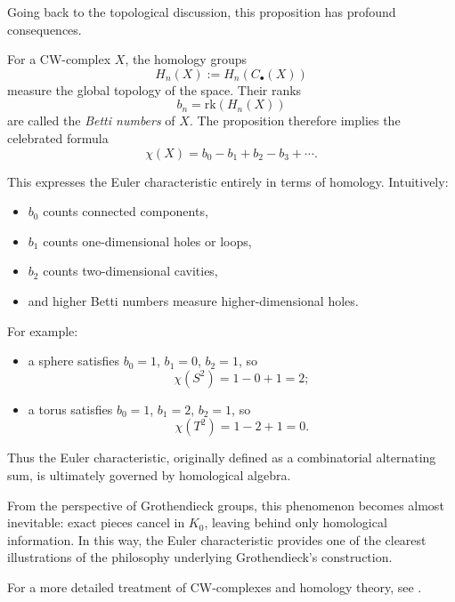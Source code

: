 \documentclass[12pt,reqno]{amsart}
\theoremstyle{plain}
\numberwithin{equation}{section}
\begin{document}
\medskip
Going back to the topological discussion, this proposition has profound consequences.

For a CW-complex $X$, the homology groups
\[
H_n(X):=H_n(C_\bullet(X))
\]
measure the global topology of the space. Their ranks
\[
b_n=\mathrm{rk}(H_n(X))
\]
are called the \emph{Betti numbers} of $X$.
The proposition therefore implies the celebrated formula
\[
\chi(X)
=
b_0-b_1+b_2-b_3+\cdots.
\]

This expresses the Euler characteristic entirely in terms of homology.
Intuitively:
\begin{itemize}
    \item $b_0$ counts connected components,
    \item $b_1$ counts one-dimensional holes or loops,
    \item $b_2$ counts two-dimensional cavities,
    \item and higher Betti numbers measure higher-dimensional holes.
\end{itemize}

For example:
\begin{itemize}
    \item a sphere satisfies $b_0=1$, $b_1=0$, $b_2=1$, so
    \[
    \chi(S^2)=1-0+1=2;
    \]
    \item a torus satisfies $b_0=1$, $b_1=2$, $b_2=1$, so
    \[
    \chi(T^2)=1-2+1=0.
    \]
\end{itemize}

Thus the Euler characteristic, originally defined as a combinatorial alternating sum, is ultimately governed by homological algebra.

From the perspective of Grothendieck groups, this phenomenon becomes almost inevitable: exact pieces cancel in $K_0$, leaving behind only homological information. In this way, the Euler characteristic provides one of the clearest illustrations of the philosophy underlying Grothendieck's construction.

For a more detailed treatment of CW-complexes and homology theory, see \cite{hatcher2002algebraic}.
\end{document}
